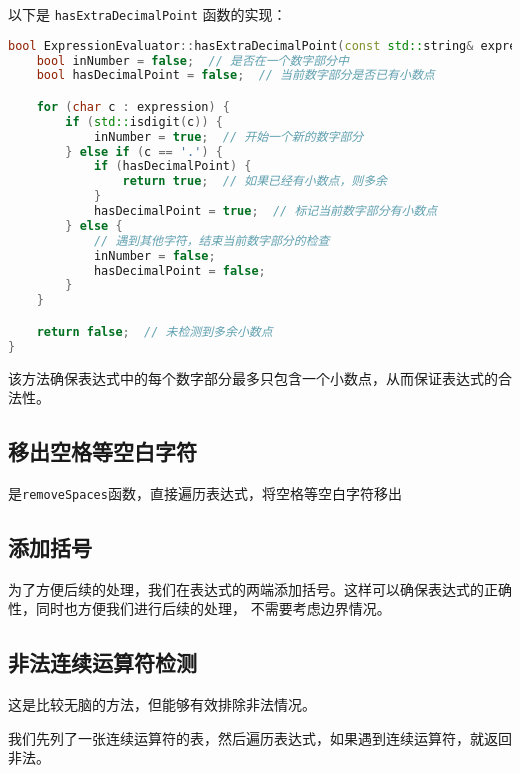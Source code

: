 \documentclass[UTF8]{ctexart}
\begin{document}
以下是 \texttt{hasExtraDecimalPoint} 函数的实现：

\begin{lstlisting}[language=C++, breaklines=true]
bool ExpressionEvaluator::hasExtraDecimalPoint(const std::string& expression) {
    bool inNumber = false;  // 是否在一个数字部分中
    bool hasDecimalPoint = false;  // 当前数字部分是否已有小数点

    for (char c : expression) {
        if (std::isdigit(c)) {
            inNumber = true;  // 开始一个新的数字部分
        } else if (c == '.') {
            if (hasDecimalPoint) {
                return true;  // 如果已经有小数点，则多余
            }
            hasDecimalPoint = true;  // 标记当前数字部分有小数点
        } else {
            // 遇到其他字符，结束当前数字部分的检查
            inNumber = false;
            hasDecimalPoint = false;
        }
    }

    return false;  // 未检测到多余小数点
}
\end{lstlisting}

该方法确保表达式中的每个数字部分最多只包含一个小数点，从而保证表达式的合法性。

\subsection{移出空格等空白字符}

是\texttt{removeSpaces}函数，直接遍历表达式，将空格等空白字符移出

\subsection{添加括号}

为了方便后续的处理，我们在表达式的两端添加括号。这样可以确保表达式的正确性，同时也方便我们进行后续的处理，
不需要考虑边界情况。

\subsection{非法连续运算符检测}

这是比较无脑的方法，但能够有效排除非法情况。

我们先列了一张连续运算符的表，然后遍历表达式，如果遇到连续运算符，就返回非法。
\end{document}
